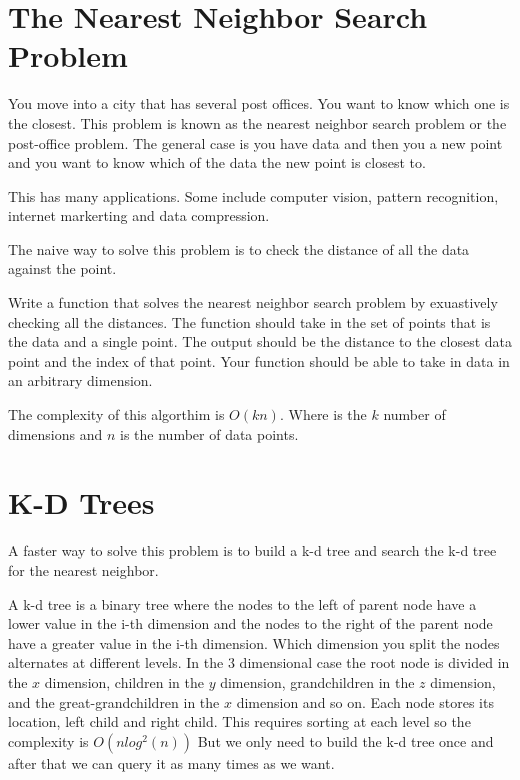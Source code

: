 \label{Ch:Knapsack}


\section*{The Nearest Neighbor Search Problem}

You move into a city that has several post offices. You want to know which one is the closest. This problem is  known as the nearest neighbor search problem or the post-office problem. The general case is you have data and then you a new point and you want to know which of the data the new point is closest to.

This has many applications. Some include computer vision, pattern recognition, internet markerting and data compression.

The naive way to solve this problem is to check the distance of all the data against the point.

\begin{problem}
Write a function that solves the nearest neighbor search problem by exuastively checking all the distances. The function should take in the set of points that is the data and a single point. The output should be the distance to the closest data point and the index of that point. Your function should be able to take in data in an arbitrary dimension.
\end{problem}

The complexity of this algorthim is $O(kn)$. Where  is the $k$ number of dimensions and $n$ is the number of data points.

\section*{K-D Trees}

A faster way to solve this problem is to build a k-d tree and search the k-d tree for the nearest neighbor. 

A k-d tree is a binary tree where the nodes to the left of parent node have a lower value in the i-th dimension and the nodes to the right of the parent node have a greater value in the i-th dimension. Which dimension you split the nodes alternates at different levels. In the $3$ dimensional case the root node is divided in the $x$ dimension, children in the $y$ dimension, grandchildren in the $z$ dimension, and the great-grandchildren in the $x$ dimension and so on. Each node stores its location, left child and right child. This requires sorting at each level so the complexity is $O(nlog^2(n))$ But we only need to build the k-d tree once and after that we can query it as many times as we want.

